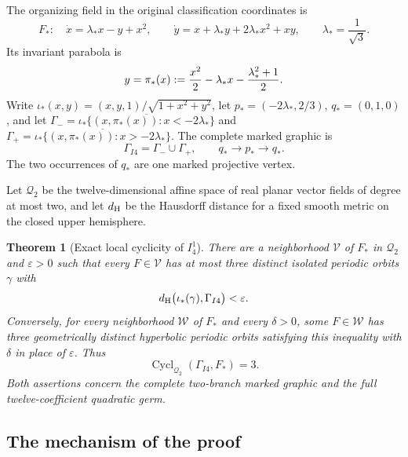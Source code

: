 \documentclass[a4paper,11pt]{article}
\numberwithin{equation}{section}
\newtheorem{theorem}{Theorem}[section]
\theoremstyle{definition}
\theoremstyle{remark}
\newcommand{\eps}{\varepsilon}
\begin{document}
The organizing field in the original classification coordinates is
\begin{equation}\label{eq:problem-field}
 F_*:\quad
 \dot x=\lambda_*x-y+x^2,\qquad
 \dot y=x+\lambda_*y+2\lambda_*x^2+xy,
 \qquad \lambda_*=\frac{1}{\sqrt3}.
\end{equation}
Its invariant parabola is
\begin{equation}\label{eq:problem-parabola}
 y=\pi_*(x):={x^2\over2}-\lambda_*x-{\lambda_*^2+1\over2}.
\end{equation}
Write
\(\iota_*(x,y)=(x,y,1)/\sqrt{1+x^2+y^2}\),
let \(p_*=(-2\lambda_*,2/3)\), \(q_*=(0,1,0)\), and let
\(\Gamma_-=\overline{\iota_*\{(x,\pi_*(x)):x<-2\lambda_*\}}\) and
\(\Gamma_+=\overline{\iota_*\{(x,\pi_*(x)):x>-2\lambda_*\}}\). The complete
marked graphic is
\begin{equation}\label{eq:positive-word}
 \Gamma_{I4}=\Gamma_-\cup\Gamma_+,
 \qquad q_*\longrightarrow p_*\longrightarrow q_*.
\end{equation}
The two occurrences of \(q_*\) are one marked projective vertex.

Let \(\mathcal Q_2\) be the twelve-dimensional affine space of real planar
vector fields of degree at most two, and let \(d_{\rm H}\) be the Hausdorff
distance for a fixed smooth metric on the closed upper hemisphere.

\begin{theorem}[Exact local cyclicity of \(I_4^1\)]\label{thm:main}
There are a neighborhood $\mathcal V$ of $F_*$ in $\mathcal Q_2$ and
$\eps>0$ such that every $F\in\mathcal V$ has at most three distinct
isolated periodic orbits $\gamma$ with
\[
 d_{\rm H}\bigl(\iota_*(\gamma),\Gamma_{I4}\bigr)<\eps.
\]
Conversely, for every neighborhood $\mathcal W$ of $F_*$ and every
$\delta>0$, some $F\in\mathcal W$ has three geometrically distinct
hyperbolic periodic orbits satisfying this inequality with $\delta$
in place of $\eps$. Thus
\[
 \operatorname{Cycl}_{\mathcal Q_2}(\Gamma_{I4},F_*)=3.
\]
Both assertions concern the complete two-branch marked graphic and
the full twelve-coefficient quadratic germ.
\end{theorem}

\subsection{The mechanism of the proof}
\end{document}
